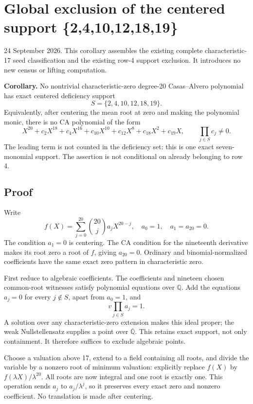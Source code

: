 \documentclass[
  british,
  10pt,
]{article}
\begin{document}
\section{Global exclusion of the centered support
\{2,4,10,12,18,19\}}\label{global-exclusion-of-the-centered-support-2410121819}

24 September 2026. This corollary assembles the existing complete
characteristic-17 seed classification and the existing row-4 support
exclusion. It introduces no new census or lifting computation.

\textbf{Corollary.} No nontrivial characteristic-zero degree-20
Casas--Alvero polynomial has exact centered deficiency support \[
S=\{2,4,10,12,18,19\}.
\] Equivalently, after centering the mean root at zero and making the
polynomial monic, there is no CA polynomial of the form \[
X^{20}+c_2X^{18}+c_4X^{16}+c_{10}X^{10}
+c_{12}X^8+c_{18}X^2+c_{19}X,
\qquad \prod_{j\in S}c_j\ne0.
\] The leading term is not counted in the deficiency set: this is one
exact seven-monomial support. The assertion is not conditional on
already belonging to row 4.

\subsection{Proof}\label{proof}

Write \[
f(X)=\sum_{j=0}^{20}\binom{20}{j}a_jX^{20-j},
\quad a_0=1,\quad a_1=a_{20}=0.
\] The condition \(a_1=0\) is centering. The CA condition for the
nineteenth derivative makes its root zero a root of \(f\), giving
\(a_{20}=0\). Ordinary and binomial-normalized coefficients have the
same exact zero pattern in characteristic zero.

First reduce to algebraic coefficients. The coefficients and nineteen
chosen common-root witnesses satisfy polynomial equations over
\(\mathbb Q\). Add the equations \(a_j=0\) for every \(j\notin S\),
apart from \(a_0=1\), and \[
v\prod_{j\in S}a_j=1.
\] A solution over any characteristic-zero extension makes this ideal
proper; the weak Nullstellensatz supplies a point over
\(\overline{\mathbb Q}\). This retains exact support, not only
containment. It therefore suffices to exclude algebraic points.

Choose a valuation above 17, extend to a field containing all roots, and
divide the variable by a nonzero root of minimum valuation: explicitly
replace \(f(X)\) by \(f(\lambda X)/\lambda^{20}\). All roots are now
integral and one root is exactly one. This operation sends \(a_j\) to
\(a_j/\lambda^j\), so it preserves every exact zero and nonzero
coefficient. No translation is made after centering.
\end{document}
